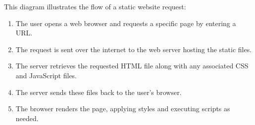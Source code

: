 \vspace*{1cm}

This diagram illustrates the flow of a static website request:
\begin{enumerate}
    \item The user opens a web browser and requests a specific page by entering a URL.\ 
    \item The request is sent over the internet to the web server hosting the static files.
    \item The server retrieves the requested HTML file along with any associated CSS and JavaScript files.
    \item The server sends these files back to the user's browser.
    \item The browser renders the page, applying styles and executing scripts as needed.
\end{enumerate}
